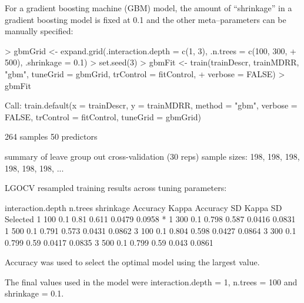 \documentclass[12pt]{article}
\begin{document}
For a gradient boosting machine (GBM) model, the amount of ``shrinkage'' in a gradient boosting model is fixed at 0.1 and the other meta--parameters can be manually specified:
\begin{small}
\begin{landscape}

\begin{Schunk}
\begin{Sinput}
> gbmGrid <- expand.grid(.interaction.depth = c(1, 3), .n.trees = c(100, 300, 
+     500), .shrinkage = 0.1)
> set.seed(3)
> gbmFit <- train(trainDescr, trainMDRR, "gbm", tuneGrid = gbmGrid, trControl = fitControl, 
+     verbose = FALSE)
> gbmFit
\end{Sinput}
\begin{Soutput}
Call:
train.default(x = trainDescr, y = trainMDRR, method = "gbm", 
    verbose = FALSE, trControl = fitControl, tuneGrid = gbmGrid)

264 samples
50 predictors

summary of leave group out cross-validation (30 reps) sample sizes:
    198, 198, 198, 198, 198, 198, ... 

LGOCV resampled training results across tuning parameters:

  interaction.depth  n.trees  shrinkage  Accuracy  Kappa  Accuracy SD  Kappa SD  Selected
  1                  100      0.1        0.81      0.611  0.0479       0.0958    *       
  1                  300      0.1        0.798     0.587  0.0416       0.0831            
  1                  500      0.1        0.791     0.573  0.0431       0.0862            
  3                  100      0.1        0.804     0.598  0.0427       0.0864            
  3                  300      0.1        0.799     0.59   0.0417       0.0835            
  3                  500      0.1        0.799     0.59   0.043        0.0861            

Accuracy was used to select the optimal model using the largest value.

The final values used in the model were interaction.depth = 1, n.trees = 100 and shrinkage = 0.1.
\end{Soutput}
\end{Schunk}

\end{landscape}
\end{small}
\end{document}
